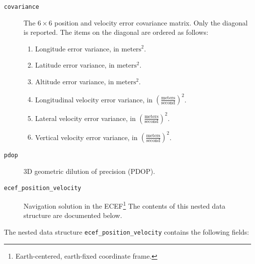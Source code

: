 \documentclass{zubaxdoc}
\begin{document}
\begin{description}
    \item[\texttt{covariance}] The $6\times6$ position and velocity error covariance matrix.
    Only the diagonal is reported. The items on the diagonal are ordered as follows:
    \begin{enumerate}
        \item Longitude error variance, in $\text{meters}^2$.
        \item Latitude error variance, in $\text{meters}^2$.
        \item Altitude error variance, in $\text{meters}^2$.
        \item Longitudinal velocity error variance, in $\left(\frac{\text{meters}}{\text{second}}\right)^2$.
        \item Lateral velocity error variance, in $\left(\frac{\text{meters}}{\text{second}}\right)^2$.
        \item Vertical velocity error variance, in $\left(\frac{\text{meters}}{\text{second}}\right)^2$.
    \end{enumerate}
    
    \item[\texttt{pdop}] 3D geometric dilution of precision (PDOP).
    
    \item[\texttt{ecef\_position\_velocity}] Navigation solution in the
    ECEF\footnote{Earth-centered, earth-fixed coordinate frame.}
    The contents of this nested data structure are documented below.
\end{description}

The nested data structure \verb|ecef_position_velocity| contains the following fields:
\end{document}
